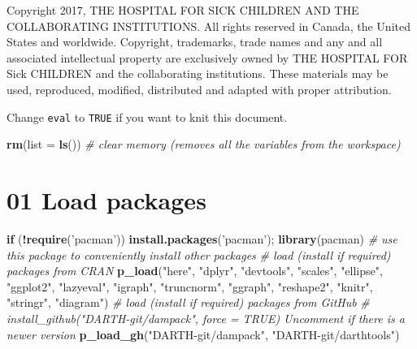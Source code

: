 \documentclass[]{article}
\newenvironment{Shaded}{\begin{snugshade}}{\end{snugshade}}
\newcommand{\KeywordTok}[1]{\textcolor[rgb]{0.13,0.29,0.53}{\textbf{#1}}}
\newcommand{\DataTypeTok}[1]{\textcolor[rgb]{0.13,0.29,0.53}{#1}}
\newcommand{\StringTok}[1]{\textcolor[rgb]{0.31,0.60,0.02}{#1}}
\newcommand{\CommentTok}[1]{\textcolor[rgb]{0.56,0.35,0.01}{\textit{#1}}}
\newcommand{\ControlFlowTok}[1]{\textcolor[rgb]{0.13,0.29,0.53}{\textbf{#1}}}
\newcommand{\OperatorTok}[1]{\textcolor[rgb]{0.81,0.36,0.00}{\textbf{#1}}}
\newcommand{\NormalTok}[1]{#1}
\begin{document}
Copyright 2017, THE HOSPITAL FOR SICK CHILDREN AND THE COLLABORATING
INSTITUTIONS. All rights reserved in Canada, the United States and
worldwide. Copyright, trademarks, trade names and any and all associated
intellectual property are exclusively owned by THE HOSPITAL FOR Sick
CHILDREN and the collaborating institutions. These materials may be
used, reproduced, modified, distributed and adapted with proper
attribution.

\newpage

Change \texttt{eval} to \texttt{TRUE} if you want to knit this document.

\begin{Shaded}
\begin{Highlighting}[]
\KeywordTok{rm}\NormalTok{(}\DataTypeTok{list =} \KeywordTok{ls}\NormalTok{())      }\CommentTok{# clear memory (removes all the variables from the workspace)}
\end{Highlighting}
\end{Shaded}

\section{01 Load packages}\label{load-packages}

\begin{Shaded}
\begin{Highlighting}[]
\ControlFlowTok{if}\NormalTok{ (}\OperatorTok{!}\KeywordTok{require}\NormalTok{(}\StringTok{'pacman'}\NormalTok{)) }\KeywordTok{install.packages}\NormalTok{(}\StringTok{'pacman'}\NormalTok{); }\KeywordTok{library}\NormalTok{(pacman) }\CommentTok{# use this package to conveniently install other packages}
\CommentTok{# load (install if required) packages from CRAN}
\KeywordTok{p_load}\NormalTok{(}\StringTok{"here"}\NormalTok{, }\StringTok{"dplyr"}\NormalTok{, }\StringTok{"devtools"}\NormalTok{, }\StringTok{"scales"}\NormalTok{, }\StringTok{"ellipse"}\NormalTok{, }\StringTok{"ggplot2"}\NormalTok{, }\StringTok{"lazyeval"}\NormalTok{, }\StringTok{"igraph"}\NormalTok{, }\StringTok{"truncnorm"}\NormalTok{, }\StringTok{"ggraph"}\NormalTok{, }\StringTok{"reshape2"}\NormalTok{, }\StringTok{"knitr"}\NormalTok{, }\StringTok{"stringr"}\NormalTok{, }\StringTok{"diagram"}\NormalTok{)                                               }
\CommentTok{# load (install if required) packages from GitHub}
\CommentTok{# install_github("DARTH-git/dampack", force = TRUE) Uncomment if there is a newer version}
\KeywordTok{p_load_gh}\NormalTok{(}\StringTok{"DARTH-git/dampack"}\NormalTok{, }\StringTok{"DARTH-git/darthtools"}\NormalTok{)}
\end{Highlighting}
\end{Shaded}
\end{document}
